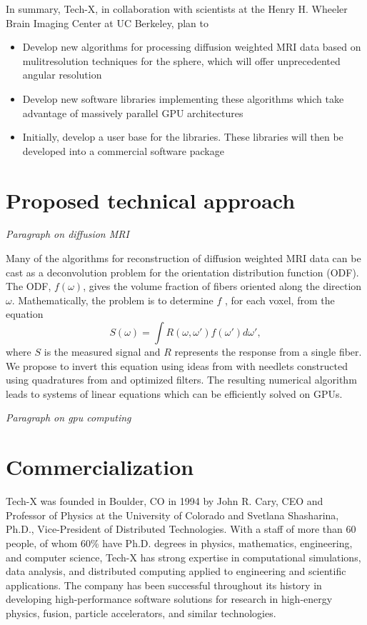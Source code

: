 \documentclass[10pt]{article}
\begin{document}
In summary, Tech-X, in collaboration with scientists at the Henry H. Wheeler Brain Imaging Center at UC Berkeley, plan to 
\begin{itemize}
  \item{Develop new algorithms for processing diffusion weighted MRI data based on mulitresolution techniques for the sphere, which will offer unprecedented angular resolution}
  \item{Develop new software libraries implementing these algorithms which take advantage of massively parallel GPU architectures}
  \item{Initially, develop a user base for the libraries. These libraries will then be developed into a commercial software package}
\end{itemize}

\section*{Proposed technical approach}
\emph{Paragraph on diffusion MRI}

Many of the algorithms for reconstruction of diffusion weighted MRI data can be cast as a deconvolution problem for the orientation distribution function (ODF)\cite{JIA-VEM-2007}. The ODF, $f\left(\omega\right)$, gives the volume fraction of fibers oriented along the direction $\omega$. Mathematically, the problem is to determine $f$ , for each voxel, from the equation
\begin{equation*}
  S\left(\omega\right) = \int R\left(\omega,\omega'\right) f\left(\omega'\right)d\omega',
\end{equation*}  
where $S$ is the measured signal and $R$ represents the response from a single fiber. We propose to invert this equation using ideas from \cite{KE-NG-PI-2009} with needlets constructed using quadratures from \cite{AHR-BEY-2009} and optimized filters. The resulting numerical algorithm leads to systems of linear equations which can be efficiently solved on GPUs.  

\emph{Paragraph on gpu computing}

\section*{Commercialization}
Tech-X was founded in Boulder, CO in 1994 by John R. Cary, CEO and Professor of Physics at the University of Colorado and Svetlana Shasharina, Ph.D., Vice-President of Distributed Technologies. With a staff of more than 60 people, of whom 60\% have Ph.D. degrees in physics, mathematics, engineering, and computer science, Tech-X has strong expertise in computational simulations, data analysis, and distributed computing applied to engineering and scientific applications.  The company has been successful throughout its history in developing high-performance software solutions for research in high-energy physics, fusion, particle accelerators, and similar technologies.
\end{document}
